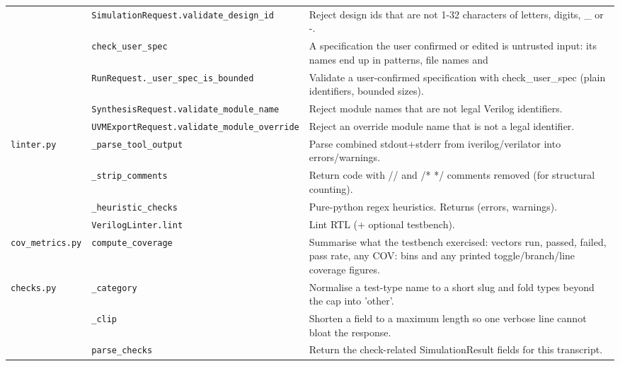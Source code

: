 \begin{longtable}{@{}p{2.8cm}>{\raggedright\arraybackslash}p{4.6cm}p{7.9cm}@{}}
{\small } & \texttt{\small SimulationRequest.\allowbreak validate\_\allowbreak{}design\_\allowbreak{}id} & Reject design ids that are not 1-32 characters of letters, digits, \_ or -. \\
{\small } & \texttt{\small check\_\allowbreak{}user\_\allowbreak{}spec} & A specification the user confirmed or edited is untrusted input: its names end up in patterns, file names and \\
{\small } & \texttt{\small RunRequest.\allowbreak \_\allowbreak{}user\_\allowbreak{}spec\_\allowbreak{}is\_\allowbreak{}bounded} & Validate a user-confirmed specification with check\_user\_spec (plain identifiers, bounded sizes). \\
{\small } & \texttt{\small SynthesisRequest.\allowbreak validate\_\allowbreak{}module\_\allowbreak{}name} & Reject module names that are not legal Verilog identifiers. \\
{\small } & \texttt{\small UVMExportRequest.\allowbreak validate\_\allowbreak{}module\_\allowbreak{}override} & Reject an override module name that is not a legal identifier. \\
{\small \nolinkurl{linter.py}} & \texttt{\small \_\allowbreak{}parse\_\allowbreak{}tool\_\allowbreak{}output} & Parse combined stdout+stderr from iverilog/verilator into errors/warnings. \\
{\small } & \texttt{\small \_\allowbreak{}strip\_\allowbreak{}comments} & Return code with // and /* */ comments removed (for structural counting). \\
{\small } & \texttt{\small \_\allowbreak{}heuristic\_\allowbreak{}checks} & Pure-python regex heuristics. Returns (errors, warnings). \\
{\small } & \texttt{\small VerilogLinter.\allowbreak lint} & Lint RTL (+ optional testbench). \\
{\small \nolinkurl{cov_metrics.py}} & \texttt{\small compute\_\allowbreak{}coverage} & Summarise what the testbench exercised: vectors run, passed, failed, pass rate, any COV: bins and any printed toggle/branch/line coverage figures. \\
{\small \nolinkurl{checks.py}} & \texttt{\small \_\allowbreak{}category} & Normalise a test-type name to a short slug and fold types beyond the cap into 'other'. \\
{\small } & \texttt{\small \_\allowbreak{}clip} & Shorten a field to a maximum length so one verbose line cannot bloat the response. \\
{\small } & \texttt{\small parse\_\allowbreak{}checks} & Return the check-related SimulationResult fields for this transcript. \\

\end{longtable}
